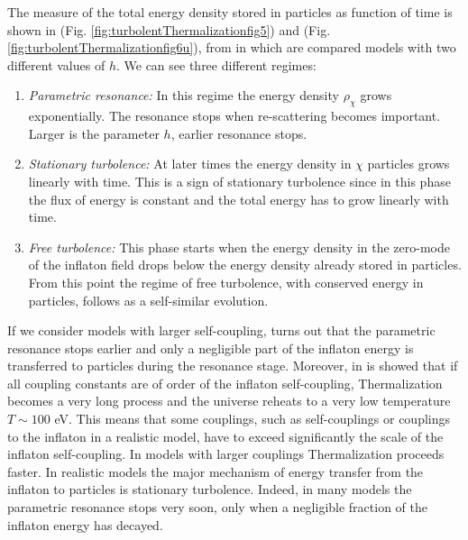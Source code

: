 \documentclass[11pt,a4paper,twoside]{book}
\begin{document}
The measure of the total energy density stored in particles as function of time is shown in (Fig. \ref{fig:turbolentThermalizationfig5}) and (Fig. \ref{fig:turbolentThermalizationfig6u}), from \cite{Chap6:TurbolentThermalization} in which are compared models with two different values of $ h $. We can see three different regimes:
\begin{enumerate}
	\item \textit{Parametric resonance:} In this regime the energy density $\rho_{\chi}$ grows exponentially. The resonance stops when re-scattering becomes important. Larger is the parameter $ h $, earlier resonance stops.
	
	\item \textit{Stationary turbolence:} At later times the energy density in $\chi$ particles grows linearly with time. This is a sign of stationary turbolence since in this phase the flux of energy is constant and the total energy has to grow linearly with time.
	
	\item \textit{Free turbolence:} This phase starts when the energy density in the zero-mode of the inflaton field drops below  the energy density already stored in particles. From this point the regime of free turbolence, with conserved energy in particles, follows as a self-similar evolution.
\end{enumerate}
If we consider models with larger self-coupling, turns out that the parametric resonance stops earlier and only a negligible part of the inflaton energy is transferred to particles during the resonance stage. Moreover, in \cite{Chap6:TurbolentThermalization} is showed that if all coupling constants are of order of the inflaton self-coupling, Thermalization becomes a very long process and the universe reheats to a very low temperature $ T \sim 100  $ eV. This means that some couplings, such as self-couplings or couplings to the inflaton in a realistic model, have to exceed significantly the scale of the inflaton self-coupling. In models with larger couplings Thermalization proceeds faster. In realistic models the major mechanism of energy transfer from the inflaton to particles is stationary turbolence. Indeed, in many models the parametric resonance stops very soon, only when a negligible fraction of the inflaton energy has decayed.
\end{document}
